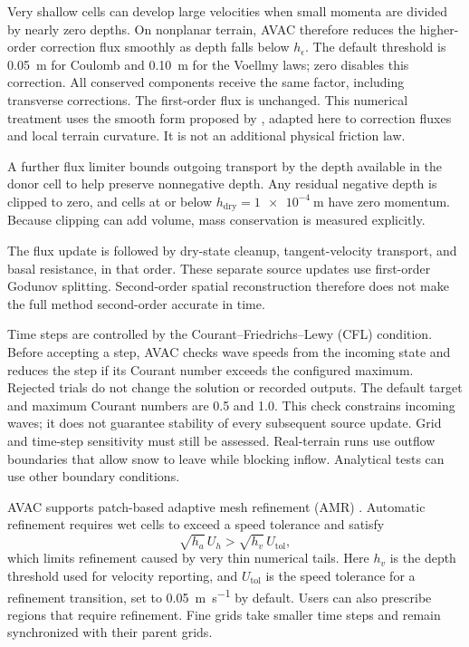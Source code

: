 \documentclass[11pt,a4paper]{article}
\begin{document}
Very shallow cells can develop large velocities when small momenta are divided
by nearly zero depths. On nonplanar terrain, AVAC therefore reduces the
higher-order correction flux smoothly as depth falls below $h_\epsilon$.
The default threshold is \SI{0.05}{\metre} for Coulomb and
\SI{0.10}{\metre} for the Voellmy laws; zero disables this correction.
All conserved components receive the same factor, including transverse
corrections. The first-order flux is unchanged. This numerical treatment
uses the smooth form proposed by \citet{KurganovPetrova2007}, adapted here to
correction fluxes and local terrain curvature. It is not an additional
physical friction law.

A further flux limiter bounds outgoing transport by the depth available in
the donor cell to help preserve nonnegative depth. Any residual negative depth
is clipped to zero, and cells at or below
$h_{\mathrm{dry}}=\SI{1e-4}{\metre}$ have zero momentum. Because clipping can
add volume, mass conservation is measured explicitly.

The flux update is followed by dry-state cleanup, tangent-velocity transport,
and basal resistance, in that order. These separate source updates use
first-order Godunov splitting. Second-order spatial reconstruction therefore
does not make the full method second-order accurate in time.

Time steps are controlled by the Courant--Friedrichs--Lewy (CFL) condition.
Before accepting a step, AVAC checks wave speeds from the incoming state and
reduces the step if its Courant number exceeds the configured maximum.
Rejected trials do not change the solution or recorded outputs. The default
target and maximum Courant numbers are 0.5 and 1.0. This check constrains
incoming waves; it does not guarantee stability of every subsequent source
update. Grid and time-step sensitivity must still be assessed.
Real-terrain runs use outflow boundaries that allow snow to leave while
blocking inflow. Analytical tests can use other boundary conditions.

AVAC supports patch-based adaptive mesh refinement (AMR)
\citep{BergerLeVeque1998,BergerEtAl2011}. Automatic refinement requires wet
cells to exceed a speed tolerance and satisfy
\begin{equation}
  \sqrt{h_a}\,U_h>\sqrt{h_v}\,U_{\mathrm{tol}},
  \label{eq:avac-amr-flag}
\end{equation}
which limits refinement caused by very thin numerical tails. Here $h_v$ is
the depth threshold used for velocity reporting, and $U_{\mathrm{tol}}$ is
the speed tolerance for a refinement transition, set to
\SI{0.05}{\metre\per\second} by default. Users can also prescribe regions
that require refinement. Fine grids take smaller time steps and remain
synchronized with their parent grids.
\end{document}

